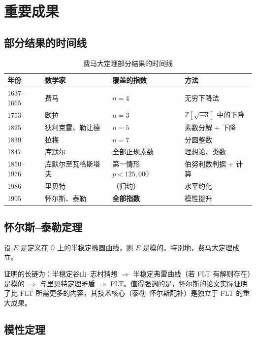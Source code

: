 \section{重要成果}\label{sec:results}

\subsection{部分结果的时间线}

\begin{table}[htbp]
    \centering
    \caption{费马大定理部分结果的时间线}
    \label{tab:timeline}
    \begin{tabular}{llll}
        \toprule
        年份 & 数学家 & 覆盖的指数 & 方法 \\
        \midrule
        1637--1665 & 费马 & $n=4$ & 无穷下降法 \\
        1753 & 欧拉 & $n=3$ & $\mathbb{Z}[\sqrt{-3}]$ 中的下降 \\
        1825 & 狄利克雷、勒让德 & $n=5$ & 素数分解 + 下降 \\
        1839 & 拉梅 & $n=7$ & 分圆整数 \\
        1847 & 库默尔 & 全部正规素数 & 理想论、类数 \\
        1850--1976 & 库默尔至瓦格斯塔夫 & 第一情形 $p < 125{,}000$ & 伯努利数判据 + 计算 \\
        1986 & 里贝特 & （归约） & 水平约化 \\
        1995 & 怀尔斯、泰勒 & \textbf{全部指数} & 模性提升 \\
        \bottomrule
    \end{tabular}
\end{table}

\subsection{怀尔斯--泰勒定理}

\begin{theorem}
    设 $E$ 是定义在 $\mathbb{Q}$ 上的半稳定椭圆曲线，则 $E$ 是模的。特别地，费马大定理成立。
\end{theorem}

证明的长链为：半稳定谷山--志村猜想 $\Rightarrow$ 半稳定弗雷曲线（若 FLT 有解则存在）是模的 $\Rightarrow$ 与里贝特定理矛盾 $\Rightarrow$ FLT。值得强调的是，怀尔斯的论文实际证明了比 FLT 所需更多的内容，其技术核心（泰勒--怀尔斯配补）是独立于 FLT 的重大成果。

\subsection{模性定理}

